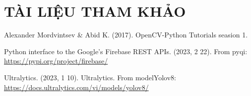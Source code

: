 \chapter*{\centering\Large{TÀI LIỆU THAM KHẢO}}

Alexander Mordvintsev \& Abid K. (2017). OpenCV-Python Tutorials seasion 1.

Python interface to the Google's Firebase REST APIs. (2023, 2 22). From pyqi: \url{https://pypi.org/project/firebase/}

Ultralytics. (2023, 1 10). Ultralytics. From modelYolov8: \url{https://docs.ultralytics.com/vi/models/yolov8/}
